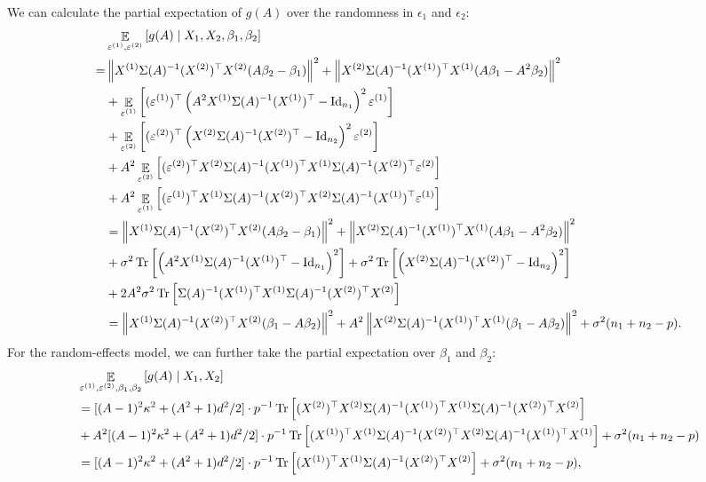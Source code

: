 We can calculate the partial expectation of $g(A)$ over the randomness in $\epsilon_1$ and $\epsilon_2$:
\begin{align*}	
&\mathop{\mathbb{E}}_{\varepsilon^{(1)}, \varepsilon^{(2)}}\left[ g(A) \mid X_1, X_2 ,\beta_1,\beta_2 \right] \\
= &\left\| X^{(1)} \Sigma(A)^{-1} (X^{(2)})^\top X^{(2)} (A\beta_2-\beta_1)\right\|^2 +\left\| X^{(2)} \Sigma(A)^{-1} (X^{(1)})^\top X^{(1)} (A\beta_1-A^2\beta_2)\right\|^2  \\
& + \mathop{\mathbb{E}}_{\varepsilon^{(1)}}\left[ (\varepsilon^{(1)})^\top \left(A^2 X^{(1)}\Sigma(A)^{-1} (X^{(1)})^\top-\operatorname{Id}_{n_1}\right)^2\varepsilon^{(1)} \right] \\
&+\mathop{\mathbb{E}}_{ \varepsilon^{(2)}}\left[ (\varepsilon^{(2)})^\top \left(X^{(2)}\Sigma(A)^{-1} (X^{(2)})^\top-\operatorname{Id}_{n_2}\right)^2\varepsilon^{(2)} \right]   \\
&+  A^2 \mathop{\mathbb{E}}_{ \varepsilon^{(2)}}\left[  (\varepsilon^{(2)} )^\top X^{(2)} \Sigma(A)^{-1}  (X^{(1)})^\top X^{(1)}\Sigma(A)^{-1} (X^{(2)})^\top \varepsilon^{(2)} \right] \\
& +A^2 \mathop{\mathbb{E}}_{ \varepsilon^{(1)}}\left[  (\varepsilon^{(1)})^\top X^{(1)} \Sigma(A)^{-1}  (X^{(2)})^\top X^{(2)}\Sigma(A)^{-1} (X^{(1)})^\top \varepsilon^{(1)}   \right]\\
		&= \left\| X^{(1)} \Sigma(A)^{-1} (X^{(2)})^\top X^{(2)} (A\beta_2-\beta_1)\right\|^2 +\left\| X^{(2)} \Sigma(A)^{-1} (X^{(1)})^\top X^{(1)} (A\beta_1-A^2\beta_2)\right\|^2  \\
		&+ \sigma^2\operatorname{Tr}\left[ \left(A^2 X^{(1)}\Sigma(A)^{-1} (X^{(1)})^\top-\operatorname{Id}_{n_1}\right)^2\right] +\sigma^2\operatorname{Tr}\left[ \left(X^{(2)}\Sigma(A)^{-1} (X^{(2)})^\top-\operatorname{Id}_{n_2}\right)^2 \right]\\
&+ 2 A^2 \sigma^2 \operatorname{Tr}\left[ \Sigma(A)^{-1}  (X^{(1)})^\top X^{(1)}\Sigma(A)^{-1} (X^{(2)})^\top X^{(2)} \right]  \nonumber\\
		& = \left\| X^{(1)} \Sigma(A)^{-1} (X^{(2)})^\top X^{(2)} (\beta_1-A\beta_2)\right\|^2 +A^2\left\| X^{(2)} \Sigma(A)^{-1} (X^{(1)})^\top X^{(1)} (\beta_1-A\beta_2)\right\|^2 +\sigma^2(n_1+n_2-p).
\end{align*}
For the random-effects model, we can further take the partial expectation over $\beta_1$ and $\beta_2$: 
\begin{align}	
&\mathop{\mathbb{E}}_{\varepsilon^{(1)}, \varepsilon^{(2)} ,\beta_1,\beta_2}\left[ g(A) \mid X_1, X_2 \right] \nonumber\\
&=[(A-1)^2\kappa^2 + (A^2+1)d^2/2] \cdot p^{-1}\operatorname{Tr}\left[  (X^{(2)})^\top X^{(2)} \Sigma(A)^{-1}(X^{(1)})^\top X^{(1)} \Sigma(A)^{-1} (X^{(2)})^\top X^{(2)}\right] \nonumber\\
&+ A^2[(A-1)^2\kappa^2 + (A^2+1)d^2/2] \cdot p^{-1}\operatorname{Tr}\left[  (X^{(1)})^\top X^{(1)} \Sigma(A)^{-1}(X^{(2)})^\top X^{(2)} \Sigma(A)^{-1} (X^{(1)})^\top X^{(1)}\right] +\sigma^2(n_1+n_2-p) \nonumber\\
&=[(A-1)^2\kappa^2 + (A^2+1)d^2/2] \cdot p^{-1} \operatorname{Tr}\left[ (X^{(1)})^\top X^{(1)} \Sigma(A)^{-1}(X^{(2)})^\top X^{(2)}\right]+\sigma^2(n_1+n_2-p), \label{EgA}
\end{align}
